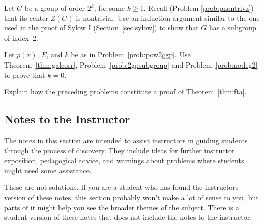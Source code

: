 \begin{problem}\label{prob:2gpsubgroup}
    Let $G$ be a group of order $2^k$, for some $k\geq 1$. Recall (Problem \ref{prob:pnontrivz}) that its center $Z(G)$ is nontrivial. Use an induction argument similar to the one used in the proof of Sylow I (Section~\ref{sec:sylow}) to show that $G$ has a subgroup of index~2.
\end{problem}

\begin{problem}
    Let $p(x)$, $E$, and $k$ be as in Problem~\ref{prob:pow2ggp}. Use Theorem~\ref{thm:galcorr}, Problem~\ref{prob:2gpsubgroup} and Problem~\ref{prob:nodeg2} to prove that $k=0$.
\end{problem}

\begin{problem}
    Explain how the preceding problems constitute a proof of Theorem~\ref{thm:fta}.
\end{problem}


\backmatter

\begin{annotation}
 \chapter{Notes to the Instructor}

 The notes in this section are intended to assist instructors in guiding students through the process of discovery. They include ideas for further instructor exposition, pedagogical advice, and warnings about problems where students might need some assistance.

 These are not solutions. If you are a student who has found the instructors version of these notes, this section probably won't make a lot of sense to you, but parts of it might help you see the broader themes of the subject. There is a student version of these notes that does not include the notes to the instructor.

 \renewcommand\notesname{}
 \vspace{-2cm}
 \begingroup
 \setlength{\parskip}{2ex}
 \def\enotesize{\large} %
 \theendnotes
 \endgroup
\end{annotation}

\vspace{.1in}


